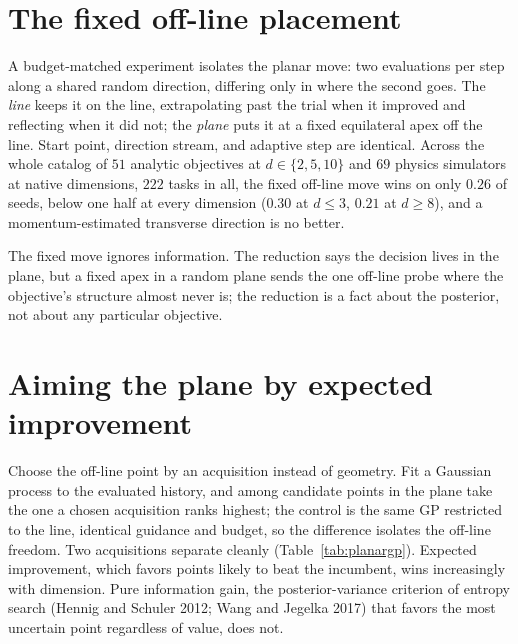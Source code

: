 \documentclass[11pt]{article}
\theoremstyle{itheads}
\begin{document}
\section{The fixed off-line placement}

A budget-matched experiment isolates the planar move: two evaluations
per step along a shared random direction, differing only in where the
second goes. The \emph{line} keeps it on the line, extrapolating past
the trial when it improved and reflecting when it did not; the
\emph{plane} puts it at a fixed equilateral apex off the line. Start
point, direction stream, and adaptive step are identical. Across the
whole catalog of $51$ analytic objectives at $d\in\{2,5,10\}$ and $69$
physics simulators at native dimensions, $222$ tasks in all, the fixed
off-line move wins on only $0.26$ of seeds, below one half at every
dimension ($0.30$ at $d\le3$, $0.21$ at $d\ge8$), and a
momentum-estimated transverse direction is no better.

The fixed move ignores information. The reduction says the decision
lives in the plane, but a fixed apex in a random plane sends the one
off-line probe where the objective's structure almost never is; the
reduction is a fact about the posterior, not about any particular
objective.

\section{Aiming the plane by expected improvement}

Choose the off-line point by an acquisition instead of geometry. Fit a
Gaussian process to the evaluated history, and among candidate points
in the plane take the one a chosen acquisition ranks highest; the
control is the same GP restricted to the line, identical guidance and
budget, so the difference isolates the off-line freedom. Two
acquisitions separate cleanly (Table~\ref{tab:planargp}). Expected
improvement, which favors points likely to beat the incumbent, wins
increasingly with dimension. Pure information gain, the
posterior-variance criterion of entropy search (Hennig and Schuler
2012; Wang and Jegelka 2017) that favors the most uncertain point
regardless of value, does not.
\end{document}
